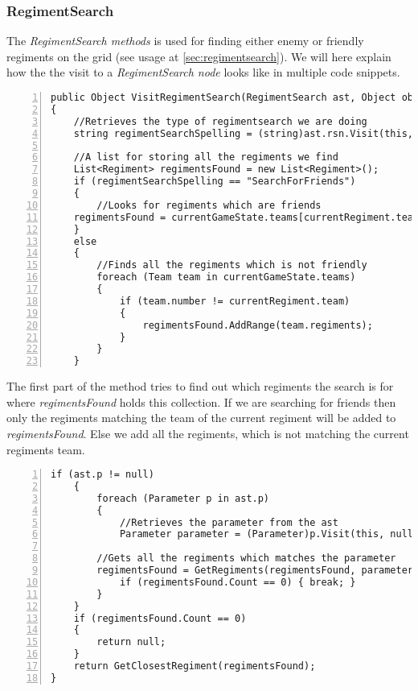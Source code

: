 	\subsubsection{RegimentSearch}
		The {\it RegimentSearch methods} is used for finding either enemy or friendly regiments on the grid (see usage at \ref{sec:regimentsearch}). 
		We will here explain how the the visit to a {\it RegimentSearch node} looks like in multiple code snippets.
		\begin{lstlisting}[basicstyle=\small\sffamily,
			keywords={break,case,const,continue,default,else,enum,
			for,if,return,switch,while,do,long,void,int,float,double,
			char,struct,typedef,include,size\_t},
			keywordstyle={\color{blue}},
			comment={[l]{//}}, morecomment={[s]{/*}{*/}}, commentstyle=\itshape,
			columns={[l]flexible}, numbers=left, numberstyle=\tiny,
			frameround=fftt, frame=shadowbox, captionpos=b,
			caption={1. part of visit of RegimentSearch node in the class BehaviourInterpreter},
			label=impl:regsearch1]		
public Object VisitRegimentSearch(RegimentSearch ast, Object obj)
{
	//Retrieves the type of regimentsearch we are doing
	string regimentSearchSpelling = (string)ast.rsn.Visit(this, null);

	//A list for storing all the regiments we find
	List<Regiment> regimentsFound = new List<Regiment>();
	if (regimentSearchSpelling == "SearchForFriends")
	{
		//Looks for regiments which are friends
	regimentsFound = currentGameState.teams[currentRegiment.team].regiments;
	}
	else
	{
		//Finds all the regiments which is not friendly
		foreach (Team team in currentGameState.teams)
		{
			if (team.number != currentRegiment.team)
			{
				regimentsFound.AddRange(team.regiments);
			}
		}
	}
		\end{lstlisting}
		The first part of the method tries to find out which regiments the search is for where {\it regimentsFound} holds this collection. 
		If we are searching for friends then only the regiments matching the team of the current regiment will be added to {\it regimentsFound}.
		Else we add all the regiments, which is not matching the current regiments team.
		\begin{lstlisting}[basicstyle=\small\sffamily,
			keywords={break,case,const,continue,default,else,enum,
			for,if,return,switch,while,do,long,void,int,float,double,
			char,struct,typedef,include,size\_t},
			keywordstyle={\color{blue}},
			comment={[l]{//}}, morecomment={[s]{/*}{*/}}, commentstyle=\itshape,
			columns={[l]flexible}, numbers=left, numberstyle=\tiny,
			frameround=fftt, frame=shadowbox, captionpos=b,
			caption={1. part of visit of RegimentSearch node in the class BehaviourInterpreter},
			label=impl:regsearch2]
	if (ast.p != null)
	{
		foreach (Parameter p in ast.p)
		{
			//Retrieves the parameter from the ast
			Parameter parameter = (Parameter)p.Visit(this, null);

		//Gets all the regiments which matches the parameter
		regimentsFound = GetRegiments(regimentsFound, parameter);
			if (regimentsFound.Count == 0) { break; }
		}
	}
	if (regimentsFound.Count == 0)
	{
		return null;
	}
	return GetClosestRegiment(regimentsFound);
}
	\end{lstlisting}
